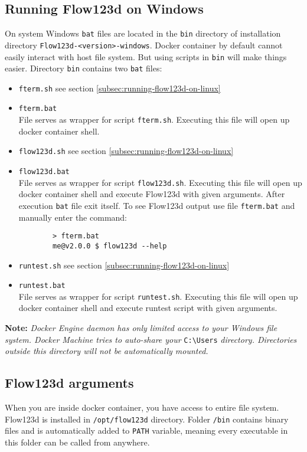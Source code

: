 \documentclass[12pt,a4paper]{report}
\begin{document}
\subsection{Running Flow123d on Windows}
On system Windows \verb'bat' files are located in the \verb'bin' directory of installation directory \verb'Flow123d-<version>-windows'.
Docker container by default cannot easily interact with host file system. But using scripts in \verb'bin' will make things easier.
Directory \verb'bin' contains two \verb'bat' files:
\begin{itemize}
	\item \verb'fterm.sh' see section \ref{subsec:running-flow123d-on-linux}
	
	\item \verb'fterm.bat' \\
	File serves as wrapper for script \verb'fterm.sh'. Executing this file will open up docker container shell.

	\item \verb'flow123d.sh' see section \ref{subsec:running-flow123d-on-linux}	
	
	\item \verb'flow123d.bat' \\
	File serves as wrapper for script \verb'flow123d.sh'. Executing this file will open up docker container shell and execute 
	Flow123d with given arguments. After execution \verb'bat' file exit itself. To see Flow123d output use file \verb'fterm.bat'
	and manually enter the command:
	\begin{verbatim}
		> fterm.bat
		me@v2.0.0 $ flow123d --help
	\end{verbatim}

	\item \verb'runtest.sh' see section \ref{subsec:running-flow123d-on-linux}	
	
	\item \verb'runtest.bat' \\
	File serves as wrapper for script \verb'runtest.sh'. Executing this file will open up docker container shell and execute 
	runtest script with given arguments.
\end{itemize}

\textbf{Note:}
\textit{Docker Engine daemon has only limited access to your Windows file system. Docker Machine tries to auto-share your}
\verb'C:\Users' \textit{directory. Directories outside this directory will not be automatically mounted.} 

\subsection{Flow123d arguments}
When you are inside docker container, you have access to entire file system. Flow123d is installed in 
\verb'/opt/flow123d' directory. Folder \verb'/bin' contains binary files and is automatically 
added to \verb'PATH' variable, meaning every executable in this folder can be called from anywhere.
\end{document}
